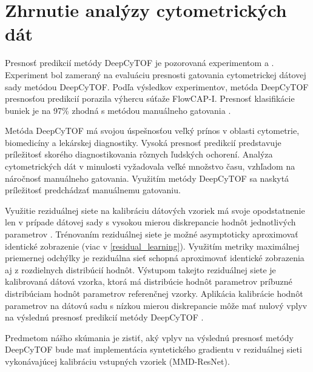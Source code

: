 \section{Zhrnutie analýzy cytometrických dát}

Presnosť predikcií metódy DeepCyTOF je pozorovaná experimentom \cite{Li2017} a \cite{Li2016}. Experiment bol zameraný na evaluáciu presnosti gatovania cytometrickej dátovej sady metódou DeepCyTOF. Podľa výsledkov experimentov, metóda DeepCyTOF presnosťou predikcií porazila výhercu súťaže FlowCAP-I. Presnosť klasifikácie buniek je na 97\% zhodná s metódou manuálneho gatovania \cite{Li2016}.

Metóda DeepCyTOF má svojou úspešnosťou veľký prínos v oblasti cytometrie, biomedicíny a lekárskej diagnostiky. Vysoká presnosť predikcií predstavuje príležitosť skorého diagnostikovania rôznych ľudských ochorení. Analýza cytometrických dát v minulosti vyžadovala veľké množstvo času, vzhľadom na náročnosť manuálneho gatovania. Využitím metódy DeepCyTOF sa naskytá príležitosť predchádzať manuálnemu gatovaniu.

Využitie reziduálnej siete na kalibráciu dátových vzoriek má svoje opodstatnenie len v prípade dátovej sady s vysokou mierou diskrepancie hodnôt jednotlivých parametrov \cite{Li2017}. Trénovaním reziduálnej siete je možné asymptoticky aproximovať identické zobrazenie (viac v \ref{residual_learning}). Využitím metriky maximálnej priemernej odchýlky je reziduálna sieť schopná aproximovať identické zobrazenia aj z rozdielnych distribúcií hodnôt. Výstupom takejto reziduálnej siete je kalibrovaná dátová vzorka, ktorá má distribúcie hodnôt parametrov príbuzné distribúciam hodnôt parametrov referenčnej vzorky. Aplikácia kalibrácie hodnôt parametrov na dátovú sadu s nízkou mierou diskrepancie môže mať nulový vplyv na výslednú presnosť predikcií metódy DeepCyTOF \cite{Li2017}.

Predmetom nášho skúmania je zistiť, aký vplyv na výslednú presnosť metódy DeepCyTOF bude mať implementácia syntetického gradientu v reziduálnej sieti vykonávajúcej kalibráciu vstupných vzoriek (MMD-ResNet).
